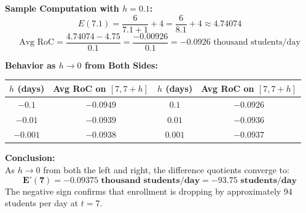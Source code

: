 \documentclass[10.5pt]{article}
\begin{document}
\textbf{Sample Computation with $h = 0.1$:}
\[
  E(7.1) = \frac{6}{7.1+1} + 4 = \frac{6}{8.1} + 4 \approx 4.74074
\]
\[
  \text{Avg RoC} = \frac{4.74074 - 4.75}{0.1} = \frac{-0.00926}{0.1} = \mathbf{-0.0926} \text{ thousand students/day}
\]

\textbf{Behavior as $h \to 0$ from Both Sides:}
\begin{center}
\begin{tabular}{|c|c||c|c|}
  \hline
  $h$ (days) & Avg RoC on $[7, 7+h]$ & $h$ (days) & Avg RoC on $[7, 7+h]$ \\
  \hline
  $-0.1$   & $-0.0949$ & $0.1$   & $-0.0926$ \\
  $-0.01$  & $-0.0939$ & $0.01$  & $-0.0936$ \\
  $-0.001$ & $-0.0938$ & $0.001$ & $-0.0937$ \\
  \hline
\end{tabular}
\end{center}

\begin{tcolorbox}[colback=chalkblue!6, colframe=chalkblue, boxrule=1pt, arc=3pt, left=8pt, right=8pt, top=4pt, bottom=4pt]
\textbf{Conclusion:}\\[1pt]
As $h \to 0$ from both the left and right, the difference quotients converge to:
\[
  \mathbf{E'(7) = -0.09375 \text{ thousand students/day} = -93.75 \text{ students/day}}
\]
The negative sign confirms that enrollment is dropping by approximately 94 students per day at $t = 7$.
\end{tcolorbox}
\end{document}
